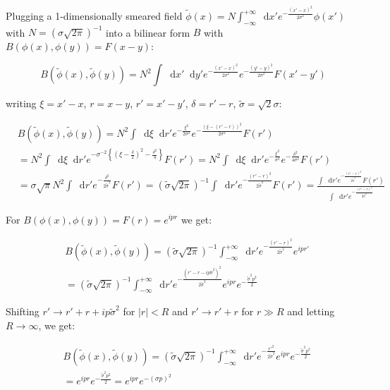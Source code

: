 \documentclass[aspectratio=169]{beamer}
\newcommand{\diffop}{\mathop{}\!\mathrm{d}}
\newcommand{\dxp}{\diffop x'}
\newcommand{\dyp}{\diffop y'}
\newcommand{\dxi}{\diffop \xi}
\newcommand{\drp}{\diffop r'}
\newcommand{\intii}{\int_{-\infty}^{+\infty}}
\newcommand{\phit}{\tilde{\phi}}
\newcommand{\sigmat}{\tilde{\sigma}}
\begin{document}
\begin{frame}
Plugging a 1-dimensionally smeared field $\phit(x) = N \int_{-\infty}^{+\infty} \dxp e^{-\frac{(x' - x)^2}{2 \sigma^2}} \phi(x')$
with $N = (\sigma \sqrt{2\pi})^{-1}$ into a bilinear form $B$ with $B(\phi(x), \phi(y)) = F(x - y)$:

\begin{equation*}
B(\phit(x), \phit(y)) = N^2 \int \dxp \dyp e^{-\frac{(x' - x)^2}{2 \sigma^2}} e^{-\frac{(y' - y)^2}{2 \sigma^2}} F(x' - y')
\end{equation*}

writing $\xi = x' - x$, $r = x - y$, $r' = x' - y'$, $\delta = r' - r$, $\sigmat = \sqrt{2} \sigma$:

\begin{equation*}
\begin{split}
&B(\phit(x), \phit(y)) = N^2 \int \dxi \drp e^{-\frac{\xi^2}{2 \sigma^2}} e^{-\frac{(\xi - (r' - r))^2}{2 \sigma^2}} F(r') \\
&= N^2 \int \dxi \drp e^{-\sigma^{-2} \left\{ (\xi - \frac{\delta}{2})^2 - \frac{\delta^2}{4} \right\}} F(r')
= N^2 \int \dxi \drp e^{-\frac{\xi^2}{\sigma^2}} e^{-\frac{\delta^2}{4 \sigma^2}} F(r') \\
&= \sigma \sqrt{\pi} N^2 \int \drp e^{-\frac{\delta^2}{2 \sigmat^2}} F(r')
= (\sigmat \sqrt{2\pi})^{-1} \int \drp e^{-\frac{(r' - r)^2}{2 \sigmat^2}} F(r')
= \frac{ \int \drp e^{-\frac{(r' - r)^2}{2 \sigmat^2}} F(r') }{ \int \drp e^{-\frac{(r' - r)^2}{2 \sigmat^2}} }
\end{split}
\end{equation*}
\end{frame}


\begin{frame}
For $B(\phi(x), \phi(y)) = F(r) = e^{ipr}$ we get:

\begin{equation*}
\begin{split}
&B(\phit(x), \phit(y)) = (\sigmat \sqrt{2\pi})^{-1} \intii \drp e^{-\frac{(r' - r)^2}{2 \sigmat^2}} e^{ipr'} \\
&= (\sigmat \sqrt{2\pi})^{-1} \intii \drp e^{-\frac{(r' - r - ip\sigmat^2)^2}{2 \sigmat^2}} e^{ipr} e^{-\frac{\sigmat^2 p^2}{2}}
\end{split}
\end{equation*}

Shifting $r' \to r'  + r + ip\sigmat^2$ for $|r| < R$ and $r' \to r' + r$ for $r \gg R$ and letting $R \to \infty$, we get:

\begin{equation*}
\begin{split}
&B(\phit(x), \phit(y)) = (\sigmat \sqrt{2\pi})^{-1} \intii \drp e^{-\frac{{r'}^2}{2 \sigmat^2}} e^{ipr} e^{-\frac{\sigmat^2 p^2}{2}} \\
&= e^{ipr} e^{-\frac{\sigmat^2 p^2}{2}} = e^{ipr} e^{-(\sigma p)^2}
\end{split}
\end{equation*}
\end{frame}
\end{document}
